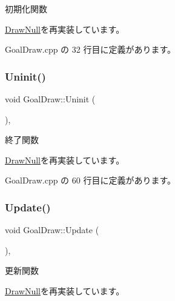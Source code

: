 初期化関数 



\mbox{\hyperlink{class_draw_null_a20aef1e54c1a158b741bfd731e18efdf}{Draw\+Null}}を再実装しています。



 Goal\+Draw.\+cpp の 32 行目に定義があります。

\mbox{\label{class_goal_draw_a01318a0606848a3ca8ca7b7acbf4df24}} 
\subsubsection{\texorpdfstring{Uninit()}{Uninit()}}
{\footnotesize\ttfamily void Goal\+Draw\+::\+Uninit (\begin{DoxyParamCaption}{ }\end{DoxyParamCaption})\hspace{0.3cm}{\ttfamily [override]}, {\ttfamily [virtual]}}



終了関数 



\mbox{\hyperlink{class_draw_null_a6e81d63efab7333e8d0e8af99362a4d9}{Draw\+Null}}を再実装しています。



 Goal\+Draw.\+cpp の 60 行目に定義があります。

\mbox{\label{class_goal_draw_a6e003277ed44eb9c800a616b6acbcb20}} 
\subsubsection{\texorpdfstring{Update()}{Update()}}
{\footnotesize\ttfamily void Goal\+Draw\+::\+Update (\begin{DoxyParamCaption}{ }\end{DoxyParamCaption})\hspace{0.3cm}{\ttfamily [override]}, {\ttfamily [virtual]}}



更新関数 



\mbox{\hyperlink{class_draw_null_ad32a508d269de7eda8ad24ea72230464}{Draw\+Null}}を再実装しています。



